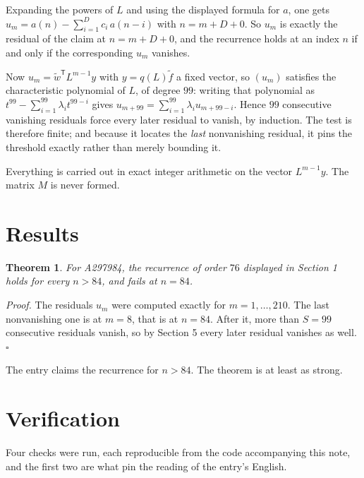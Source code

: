 \documentclass[11pt]{article}
\newtheorem{theorem}{Theorem}
\theoremstyle{definition}
\begin{document}
Expanding the powers of $L$ and using the displayed formula for $a$, one gets $u_m = a(n) - \sum_{i=1}^{D} c_i\,a(n-i)$ with $n = m + D + 0$. So $u_m$ is exactly the residual of the claim at $n = m + D + 0$, and the recurrence holds at an index $n$ if and only if the corresponding $u_m$ vanishes.

Now $u_m = \tilde w^{\mathsf T} L^{m-1} y$ with $y = q(L)\tilde f$ a fixed vector, so $(u_m)$ satisfies the characteristic polynomial of $L$, of degree $99$: writing that polynomial as $t^{99} - \sum_{i=1}^{99} \lambda_i t^{99-i}$ gives $u_{m+99} = \sum_{i=1}^{99} \lambda_i u_{m+99-i}$. Hence $99$ consecutive vanishing residuals force every later residual to vanish, by induction. The test is therefore finite; and because it locates the {\itshape last} nonvanishing residual, it pins the threshold exactly rather than merely bounding it.

Everything is carried out in exact integer arithmetic on the vector $L^{m-1}y$. The matrix $M$ is never formed.

\section{Results}

\begin{theorem} For A297984, the recurrence of order $76$ displayed in Section 1 holds for every $n > 84$, and fails at $n = 84$.\end{theorem}

{\itshape Proof.} The residuals $u_m$ were computed exactly for $m = 1,\dots,210$. The last nonvanishing one is at $m = 8$, that is at $n = 84$. After it, more than $S = 99$ consecutive residuals vanish, so by Section 5 every later residual vanishes as well. $\square$

The entry claims the recurrence for $n > 84$. The theorem is at least as strong.

\section{Verification}

Four checks were run, each reproducible from the code accompanying this note, and the first two are what pin the reading of the entry's English.
\end{document}
